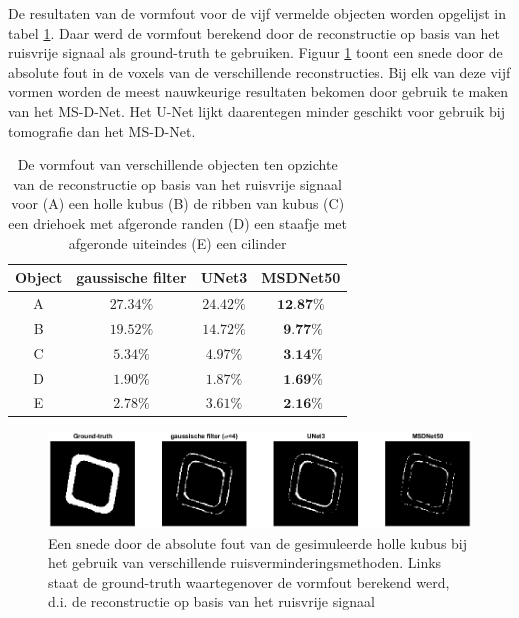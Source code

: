 \documentclass{report}
\begin{document}
De resultaten van de vormfout voor de vijf vermelde objecten worden opgelijst in tabel \ref{tab:tomo_simres}. Daar werd de vormfout berekend door de reconstructie op basis van het ruisvrije signaal als ground-truth te gebruiken. Figuur \ref{fig:tomo_simres} toont een snede door de absolute fout in de voxels van de verschillende reconstructies. Bij elk van deze vijf vormen worden de meest nauwkeurige resultaten bekomen door gebruik te maken van het MS-D-Net. Het U-Net lijkt daarentegen minder geschikt voor gebruik bij tomografie dan het MS-D-Net.
\begin{table}[h!]
	\centering
	\caption{De vormfout van verschillende objecten ten opzichte van de reconstructie op basis van het ruisvrije signaal voor (A) een holle kubus (B) de ribben van kubus (C) een driehoek met afgeronde randen (D) een staafje met afgeronde uiteindes (E) een cilinder}
	\begin{tabular}{|c|ccc|}
		\hline
		Object & gaussische filter & UNet3 & MSDNet50 \\
		\hline
		A & $27.34\%$ & $24.42\%$ & $\textbf{12.87}\%$ \\
		B & $19.52\%$ & $14.72\%$ & $\textbf{ 9.77}\%$ \\
		C & $ 5.34\%$ & $ 4.97\%$ & $\textbf{ 3.14}\%$ \\
		D & $ 1.90\%$ & $ 1.87\%$ & $\textbf{ 1.69}\%$ \\
		E & $ 2.78\%$ & $ 3.61\%$ & $\textbf{ 2.16}\%$ \\
		\hline
	\end{tabular}
	\label{tab:tomo_simres}
\end{table}
\begin{figure}[h!]
	\centering
	\includegraphics[width=15cm]{images/tomo/simulated.png}
	\caption{Een snede door de absolute fout van de gesimuleerde holle kubus bij het gebruik van verschillende ruisverminderingsmethoden. Links staat de ground-truth waartegenover de vormfout berekend werd, d.i. de reconstructie op basis van het ruisvrije signaal}
	\label{fig:tomo_simres}
\end{figure}
\end{document}
